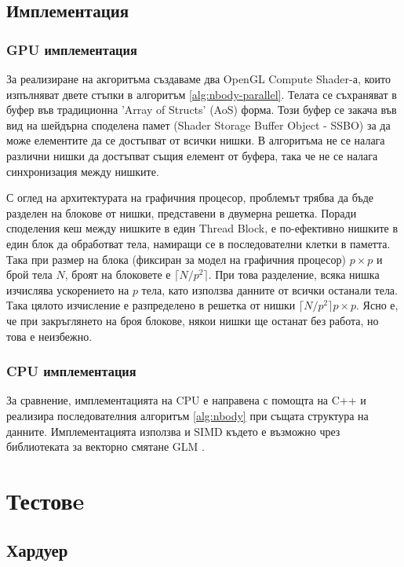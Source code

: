 \documentclass[11pt, a4paper]{article}
\begin{document}
\begin{sloppypar}
\subsection{Имплементация}

\subsubsection{GPU имплементация}
За реализиране на акгоритъма създаваме два OpenGL Compute Shader-а, които изпълняват двете стъпки в алгоритъм \ref{alg:nbody-parallel}. Телата се съхраняват в буфер във традиционна 'Array of Structs' (AoS) форма. Този буфер се закача във вид на шейдърна споделена памет (Shader Storage Buffer Object - SSBO) за да може елементите да се достъпват от всички нишки. В алгоритъма не се налага различни нишки да достъпват същия елемент от буфера, така че не се налага синхронизация между нишките. 

С оглед на архитектурата на графичния процесор, проблемът трябва да бъде разделен на блокове от нишки, представени в двумерна решетка. Поради споделения кеш между нишките в един Thread Block, е по-ефективно нишките в един блок да обработват тела, намиращи се в последователни клетки в паметта. Така при размер на блока (фиксиран за модел на графичния процесор) $p \times p$ и брой тела $N$, броят на блоковете е $\lceil N / p^2 \rceil$. При това разделение, всяка нишка изчислява ускорението на $p$ тела, като използва данните от всички останали тела. Така цялото изчисление е разпределено в решетка от нишки $\lceil N / p^2 \rceil p \times p$. Ясно е, че при закръглянето на броя блокове, някои нишки ще останат без работа, но това е неизбежно.

\subsubsection{CPU имплементация}

За сравнение, имплементацията на CPU е направена с помощта на C++ и реализира последователния алгоритъм \ref{alg:nbody} при същата структура на данните. Имплементацията използва и SIMD където е възможно чрез библиотеката за векторно смятане GLM \cite{riccio2010glm}.

\section{Тестовe}

\subsection{Хардуер}


\end{sloppypar}
\end{document}
